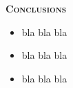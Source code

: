 \documentclass[final,t]{beamer}
\begin{document}
\begin{frame}{}
\begin{columns}
\begin{column}{.5\linewidth}
%
%
	\begin{block}{\textsc{\textbf{Conclusions}}}
		\vspace*{3mm}

		\begin{itemize}
			\item  bla bla bla
			\item  bla bla bla
			\item  bla bla bla
		\end{itemize}
		\vspace*{3mm}
	\end{block}
	\end{column}


	\end{columns}
	\end{frame}
\end{document}
